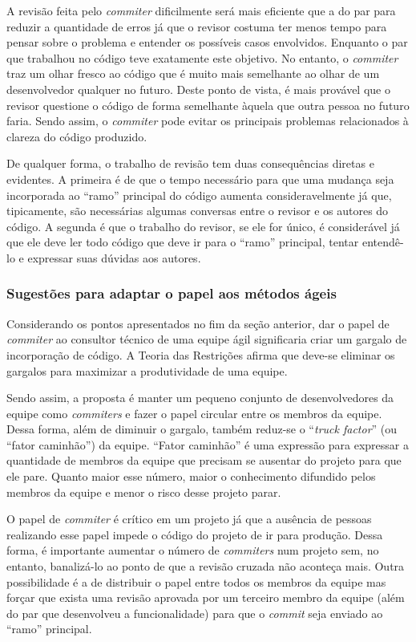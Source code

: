 A revisão feita pelo \emph{commiter} dificilmente será mais eficiente
que a do par para reduzir a quantidade de erros já que o revisor
costuma ter menos tempo para pensar sobre o problema e entender os
possíveis casos envolvidos. Enquanto o par que trabalhou no código
teve exatamente este objetivo. No entanto, o \emph{commiter} traz um
olhar fresco ao código que é muito mais semelhante ao olhar de um
desenvolvedor qualquer no futuro. Deste ponto de vista, é mais
provável que o revisor questione o código de forma semelhante àquela
que outra pessoa no futuro faria. Sendo assim, o \emph{commiter} pode
evitar os principais problemas relacionados à clareza do código
produzido.

De qualquer forma, o trabalho de revisão tem duas consequências
diretas e evidentes. A primeira é de que o tempo necessário para que
uma mudança seja incorporada ao ``ramo'' principal do código aumenta
consideravelmente já que, tipicamente, são necessárias algumas
conversas entre o revisor e os autores do código. A segunda é que o
trabalho do revisor, se ele for único, é considerável já que ele deve
ler todo código que deve ir para o ``ramo'' principal, tentar
entendê-lo e expressar suas dúvidas aos autores.

\subsubsection{Sugestões para adaptar o papel aos métodos ágeis}

Considerando os pontos apresentados no fim da seção anterior, dar o
papel de \emph{commiter} ao consultor técnico de uma equipe ágil
significaria criar um gargalo de incorporação de código. A Teoria das
Restrições \cite{goldratt84} afirma que deve-se eliminar os gargalos
para maximizar a produtividade de uma equipe.

Sendo assim, a proposta é manter um pequeno conjunto de
desenvolvedores da equipe como \emph{commiters} e fazer o papel
circular entre os membros da equipe. Dessa forma, além de diminuir o
gargalo, também reduz-se o ``\textit{truck
  factor}''\cite{Williams2002} (ou ``fator caminhão'') da
equipe. ``Fator caminhão'' é uma expressão para expressar a quantidade
de membros da equipe que precisam se ausentar do projeto para que ele
pare. Quanto maior esse número, maior o conhecimento difundido pelos
membros da equipe e menor o risco desse projeto parar.

O papel de \emph{commiter} é crítico em um projeto já que a ausência
de pessoas realizando esse papel impede o código do projeto de ir para
produção. Dessa forma, é importante aumentar o número de
\emph{commiters} num projeto sem, no entanto, banalizá-lo ao ponto de
que a revisão cruzada não aconteça mais. Outra possibilidade é a de
distribuir o papel entre todos os membros da equipe mas forçar que
exista uma revisão aprovada por um terceiro membro da equipe (além do
par que desenvolveu a funcionalidade) para que o \emph{commit} seja
enviado ao ``ramo'' principal.


